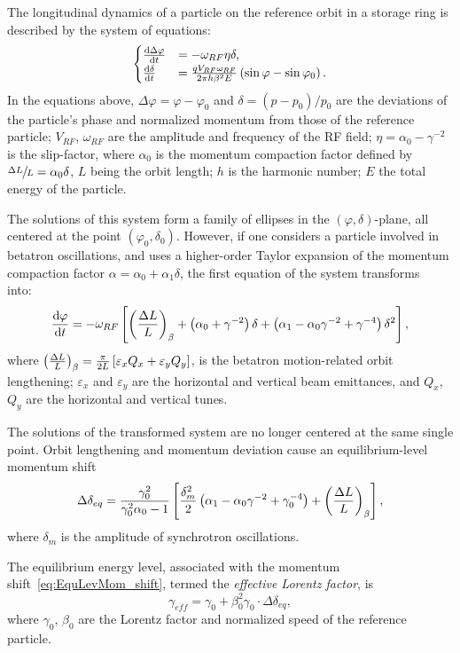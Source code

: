 \documentclass[a4paper]{jacow}
\newcommand{\w}{\omega}
\newcommand{\D}{\Delta}
\begin{document}
The longitudinal dynamics of a particle on the reference orbit in a storage ring is described by
the system of equations:
\begin{equation}
  \begin{cases}
    \ddt{\D\varphi} &= -\w_{RF}\eta\delta, \\
    \ddt{\delta} &= \frac{q V_{RF}\w_{RF}}{2\pi h\beta^2E}\bkt{\sin\varphi - \sin\varphi_0}.
  \end{cases}
\end{equation}
In the equations above, $\D\varphi = \varphi-\varphi_0$ and  $\delta = (p-p_0)/p_0$ are the deviations
of the particle's phase and normalized momentum from those of the reference particle;
$V_{RF}$, $\w_{RF}$ are the amplitude and frequency of the RF field;
$\eta = \alpha_0 - \gamma^{-2}$ is the slip-factor, where $\alpha_0$ is
the momentum compaction factor defined by $\sfrac{\Delta L}{L} = \alpha_0\delta$, $L$ being the orbit length;
$h$ is the harmonic number; $E$ the total energy of the particle.

The solutions of this system form a family of ellipses in the $(\varphi, \delta)$-plane, all centered at the point
$(\varphi_0,\delta_0)$. However, if one considers a particle involved in betatron oscillations, and uses a
higher-order Taylor expansion of the momentum compaction factor $\alpha = \alpha_0 + \alpha_1\delta$,
the first equation of the system transforms into:~\cite[p.~2579]{Senichev:IPAC13}
\[
\ddt{\varphi} = -\w_{RF} \bkt*{\bkt{\frac{\Delta L}{L}}_\beta + \bkt{\alpha_0 + \gamma^{-2}}\delta + \bkt{\alpha_1 - \alpha_0\gamma^{-2} + \gamma^{-4}}\delta^2},
\]
where $\bkt{\frac{\Delta L}{L}}_\beta = \frac{\pi}{2L}\bkt*{\varepsilon_xQ_x + \varepsilon_yQ_y}$, is
the betatron motion-related orbit lengthening; $\varepsilon_x$ and $\varepsilon_y$ are the
horizontal and vertical beam emittances, and $Q_x$, $Q_y$ are the horizontal and vertical tunes.

The solutions of the transformed system are no longer centered at the same single point.
Orbit lengthening and momentum deviation cause an equilibrium-level momentum shift~\cite[p.~2581]{Senichev:IPAC13}
\begin{equation}\label{eq:EquLevMom_shift}
\Delta\delta_{eq} = \frac{\gamma_0^2}{\gamma_0^2\alpha_0 - 1}\bkt*{\frac{\delta_m^2}{2}\bkt{\alpha_1 - \alpha_0\gamma^{-2} + \gamma_0^{-4}} + \bkt{\frac{\Delta L}{L}}_\beta},
\end{equation}
where $\delta_m$ is the amplitude of synchrotron oscillations.

The equilibrium energy level, associated with the momentum shift~\eqref{eq:EquLevMom_shift},
termed the \emph{effective Lorentz factor}, is\cite{Senichev:FDM}
\begin{equation}\label{eq:EffectiveGamma}
\gamma_{eff} = \gamma_0 + \beta_0^2\gamma_0\cdot\Delta\delta_{eq},
\end{equation}
where $\gamma_0$, $\beta_0$ are the Lorentz factor and normalized speed of the reference particle.
\end{document}
